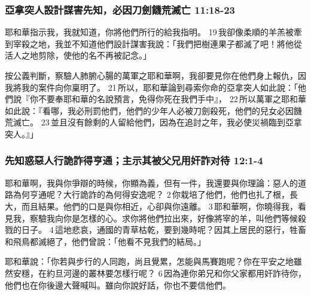 \subsubsection{亞拿突人設計謀害先知，必因刀劍饑荒滅亡 11:18-23}
耶和華指示我，我就知道，你將他們所行的給我指明。 19 我卻像柔順的羊羔被牽到宰殺之地，我並不知道他們設計謀害我說：「我們把樹連果子都滅了吧！將他從活人之地剪除，使他的名不再被記念。」

按公義判斷，察驗人肺腑心腸的萬軍之耶和華啊，我卻要見你在他們身上報仇，因我將我的案件向你稟明了。 21 所以，耶和華論到尋索你命的亞拿突人如此說：「他們說『你不要奉耶和華的名說預言，免得你死在我們手中』， 22 所以萬軍之耶和華如此說：『看哪，我必刑罰他們，他們的少年人必被刀劍殺死，他們的兒女必因饑荒滅亡。 23 並且沒有餘剩的人留給他們，因為在追討之年，我必使災禍臨到亞拿突人。』」

\subsubsection{先知惑惡人行詭詐得亨通；主示其被父兄用奸詐对待 12:1-4}
耶和華啊，我與你爭辯的時候，你顯為義，但有一件，我還要與你理論：惡人的道路為何亨通呢？大行詭詐的為何得安逸呢？ 2 你栽培了他們，他們也扎了根，長大，而且結果。他們的口是與你相近，心卻與你遠離。 3 耶和華啊，你曉得我，看見我，察驗我向你是怎樣的心。求你將他們拉出來，好像將宰的羊，叫他們等候殺戮的日子。 4 這地悲哀，通國的青草枯乾，要到幾時呢？因其上居民的惡行，牲畜和飛鳥都滅絕了，他們曾說：「他看不見我們的結局。」

耶和華說：「你若與步行的人同跑，尚且覺累，怎能與馬賽跑呢？你在平安之地雖然安穩，在約旦河邊的叢林要怎樣行呢？ 6 因為連你弟兄和你父家都用奸詐待你，他們也在你後邊大聲喊叫。雖向你說好話，你也不要信他們。

